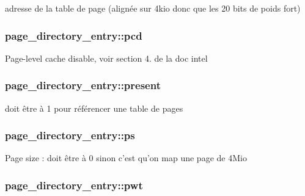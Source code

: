 adresse de la table de page (alignée sur 4kio donc que les 20 bits de poids fort) \hypertarget{structpage__directory__entry_ae480766b759f04eeb2443e12d185616a}{
\subsubsection[{pcd}]{ {\bf page\-\_\-directory\-\_\-entry\-::pcd}}}\label{structpage__directory__entry_ae480766b759f04eeb2443e12d185616a}
\-Page-\/level cache disable, voir section 4. de la doc intel \hypertarget{structpage__directory__entry_ac5b5f5ab165ce60453db02e68bd7cc22}{
\subsubsection[{present}]{ {\bf page\-\_\-directory\-\_\-entry\-::present}}}\label{structpage__directory__entry_ac5b5f5ab165ce60453db02e68bd7cc22}
doit être à 1 pour référencer une table de pages \hypertarget{structpage__directory__entry_a35108b74ca7560e2ecf3f296d375c87f}{
\subsubsection[{ps}]{ {\bf page\-\_\-directory\-\_\-entry\-::ps}}}\label{structpage__directory__entry_a35108b74ca7560e2ecf3f296d375c87f}
\-Page size \-: doit être à 0 sinon c'est qu'on map une page de 4\-Mio \hypertarget{structpage__directory__entry_a8eea5779d287c1ef5e6f2073b93166a6}{
\subsubsection[{pwt}]{ {\bf page\-\_\-directory\-\_\-entry\-::pwt}}}\label{structpage__directory__entry_a8eea5779d287c1ef5e6f2073b93166a6}
